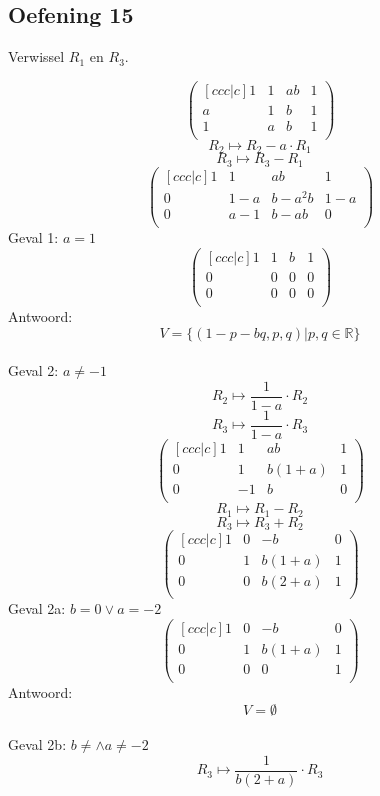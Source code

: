 \documentclass[lineaire_algebra_oplossingen.tex]{subfiles}
\begin{document}
\subsection{Oefening 15}
\begin{center}
Verwissel $R_1$ en $R_3$.
\end{center}
\[
\begin{pmatrix}[ccc|c]
1 & 1 & ab & 1\\
a & 1 & b & 1\\
1 & a & b & 1\\
\end{pmatrix}
\]
\[ R_2 \longmapsto R_2 - a\cdot R_1 \]
\[ R_3 \longmapsto R_3 - R_1 \]
\[
\begin{pmatrix}[ccc|c]
1 & 1 & ab & 1\\
0 & 1-a & b-a^2b & 1-a\\
0 & a-1 & b-ab & 0\\
\end{pmatrix}
\]
Geval 1: $a=1$
\[
\begin{pmatrix}[ccc|c]
1 & 1 & b & 1\\
0 & 0 & 0 & 0\\
0 & 0 & 0 & 0\\
\end{pmatrix}
\]
Antwoord:
\[
V = \{ (1-p-bq,p,q) | p,q \in \mathbb{R} \}
\]\\
Geval 2: $a \neq -1$
\[ R_2 \longmapsto \frac{1}{1-a}\cdot R_2 \]
\[ R_3 \longmapsto \frac{1}{1-a}\cdot R_3 \]
\[
\begin{pmatrix}[ccc|c]
1 & 1 & ab & 1\\
0 & 1 & b(1+a) & 1\\
0 & -1 & b & 0\\
\end{pmatrix}
\]
\[ R_1 \longmapsto R_1 - R_2 \]
\[ R_3 \longmapsto R_3 + R_2 \]
\[
\begin{pmatrix}[ccc|c]
1 & 0 & -b & 0\\
0 & 1 & b(1+a) & 1\\
0 & 0 & b(2+a) & 1\\
\end{pmatrix}
\]
Geval 2a: $b=0 \vee a=-2$
\[
\begin{pmatrix}[ccc|c]
1 & 0 & -b & 0\\
0 & 1 & b(1+a) & 1\\
0 & 0 & 0 & 1\\
\end{pmatrix}
\]
Antwoord:
\[
V=\emptyset
\]\\
Geval 2b: $b\neq \wedge a \neq -2$
\[ R_3 \longmapsto \frac{1}{b(2+a)}\cdot R_3 \]
\end{document}
